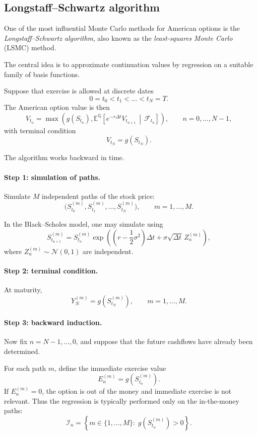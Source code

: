 \documentclass[11pt]{article}
\newcommand{\Qbb}{\mathbb{Q}}
\theoremstyle{definition}
\theoremstyle{plain}
\begin{document}
\subsection{Longstaff--Schwartz algorithm}

One of the most influential Monte Carlo methods for American options is
the \emph{Longstaff--Schwartz algorithm}, also known as the
\emph{least-squares Monte Carlo} (LSMC) method.

The central idea is to approximate continuation values by regression on
a suitable family of basis functions.

\medskip

Suppose that exercise is allowed at discrete dates
\[
0=t_0<t_1<\dots<t_N=T.
\]
The American option value is then
\[
V_{t_n}
=
\max\!\left(
g(S_{t_n}),
\mathbb E^{\Qbb}\!\left[
e^{-r\Delta t}V_{t_{n+1}}
\,\middle|\, \mathcal F_{t_n}
\right]
\right),
\qquad n=0,\dots,N-1,
\]
with terminal condition
\[
V_{t_N}=g(S_{t_N}).
\]

The algorithm works backward in time.

\paragraph{Step 1: simulation of paths.}
Simulate \(M\) independent paths of the stock price:
\[
\big(S_{t_0}^{(m)},S_{t_1}^{(m)},\dots,S_{t_N}^{(m)}\big),
\qquad m=1,\dots,M.
\]

In the Black--Scholes model, one may simulate using
\[
S_{t_{n+1}}^{(m)}
=
S_{t_n}^{(m)}
\exp\!\left(
\left(r-\frac12\sigma^2\right)\Delta t
+
\sigma \sqrt{\Delta t}\, Z_n^{(m)}
\right),
\]
where \(Z_n^{(m)}\sim\mathcal N(0,1)\) are independent.

\paragraph{Step 2: terminal condition.}
At maturity,
\[
Y_N^{(m)} = g\!\left(S_{t_N}^{(m)}\right),
\qquad m=1,\dots,M.
\]

\paragraph{Step 3: backward induction.}
Now fix \(n=N-1,\dots,0\), and suppose that the future cashflows have
already been determined.

For each path \(m\), define the immediate exercise value
\[
E_n^{(m)} = g\!\left(S_{t_n}^{(m)}\right).
\]
If \(E_n^{(m)}=0\), the option is out of the money and immediate exercise
is not relevant.
Thus the regression is typically performed only on the in-the-money
paths:
\[
\mathcal I_n
=
\left\{
m\in\{1,\dots,M\}:\;
g\!\left(S_{t_n}^{(m)}\right)>0
\right\}.
\]
\end{document}
